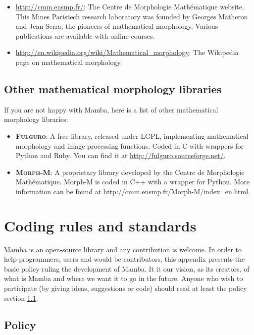 \documentclass[a4paper,10pt,oneside]{article}
\begin{document}
\begin{itemize}
\item \url{http://cmm.ensmp.fr/}: The Centre de Morphologie Math\'{e}matique
website. This Mines Paristech research laboratory was founded by Georges Matheron 
and Jean Serra, the pioneers of mathematical
morphology. Various publications are available with online courses.
\item \url{http://en.wikipedia.org/wiki/Mathematical_morphology}: The Wikipedia
page on mathematical morphology.
\end{itemize}

\subsection{Other mathematical morphology libraries}

If you are not happy with Mamba, here is a list of other mathematical morphology
libraries:

\begin{itemize}
\item \textsc{\textbf{Fulguro}}: A free library, released under LGPL, implementing
mathematical morphology and image processing functions. Coded in C with wrappers
for Python and Ruby. You can find it at \url{http://fulguro.sourceforge.net/}.
\item \textsc{\textbf{Morph-M}}: A proprietary library developed by the Centre
de Morphologie Math\'{e}matique. Morph-M is coded in C++ with a wrapper for
Python. More information can be found at \url{http://cmm.ensmp.fr/Morph-M/index_en.html}.
\end{itemize}

\pagebreak

\section{Coding rules and standards}
\label{rules}

Mamba is an open-source library and any contribution is welcome. In
order to help programmers, users and would be contributors, this appendix
presents the basic policy ruling the development of Mamba. It it our
vision, as its creators, of what is Mamba and where we want it to go
in the future. Anyone who wish to participate (by giving ideas, suggestions
or code) should read at least the policy section \ref{cha:Policy}.

\subsection{Policy}
\label{cha:Policy}
\end{document}
